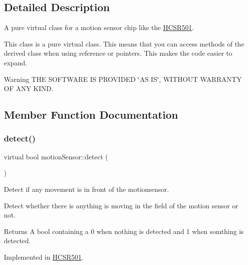 \subsection{Detailed Description}
A pure virtual class for a motion sensor chip like the \mbox{\hyperlink{class_h_c_s_r501}{H\+C\+S\+R501}}. 

This class is a pure virtual class. This means that you can access methods of the derived class when using reference or pointers. This makes the code easier to expand. \begin{DoxyWarning}{Warning}
T\+HE S\+O\+F\+T\+W\+A\+RE IS P\+R\+O\+V\+I\+D\+ED \char`\"{}\+A\+S I\+S\char`\"{}, W\+I\+T\+H\+O\+UT W\+A\+R\+R\+A\+N\+TY OF A\+NY K\+I\+ND. 
\end{DoxyWarning}


\subsection{Member Function Documentation}
\mbox{\label{classmotion_sensor_a0b8701a41516d8b1140c39474b1db9db}} 
\subsubsection{\texorpdfstring{detect()}{detect()}}
{\footnotesize\ttfamily virtual bool motion\+Sensor\+::detect (\begin{DoxyParamCaption}{ }\end{DoxyParamCaption})\hspace{0.3cm}{\ttfamily [pure virtual]}}



Detect if any movement is in front of the motionsensor. 

Detect whether there is anything is moving in the field of the motion sensor or not. \begin{DoxyReturn}{Returns}
A bool containing a 0 when nothing is detected and 1 when somthing is detected. 
\end{DoxyReturn}


Implemented in \mbox{\hyperlink{class_h_c_s_r501_a75456a573bf0066ee648f8f1a39d4966}{H\+C\+S\+R501}}.

\mbox{\label{classmotion_sensor_a718bb6e111adc734ce6e595e28664581}} 
